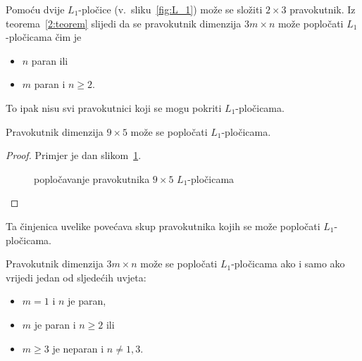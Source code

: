 \documentclass[11pt]{scrartcl}
\begin{document}
Pomoću dvije $L_1$-pločice (v.\ sliku~\ref{fig:L_1}) može se složiti $2 \times 3$ pravokutnik. Iz teorema~\ref{2:teorem} slijedi da se pravokutnik dimenzija $3m \times n$ može popločati $L_1$-pločicama čim je
\begin{itemize}
\item $n$ paran ili
\item $m$ paran i $n \geq 2$.
\end{itemize}
To ipak nisu svi pravokutnici koji se mogu pokriti $L_1$-pločicama. 
\begin{lema} \label{L_1:lema}
Pravokutnik dimenzija $9 \times 5$ može se popločati $L_1$-pločicama.
\end{lema}
\begin{proof}
Primjer je dan slikom~\ref{fig:9times5}.
\begin{figure}[ht]
\centering
{}
\caption{popločavanje pravokutnika $9 \times 5$ $L_1$-pločicama}
\label{fig:9times5}
\end{figure}
\end{proof}
\noindent Ta činjenica uvelike povećava skup pravokutnika kojih se može popločati $L_1$-pločicama.
\begin{teorem} Pravokutnik dimenzija $3m \times n$ može se popločati $L_1$-pločicama ako i samo ako vrijedi jedan od sljedećih uvjeta:
\begin{itemize}
\item $m = 1$ i $n$ je paran,
\item $m$ je paran i $n \geq 2$ ili
\item $m \geq 3$ je neparan i $n \neq 1,3$.
\end{itemize}
\end{teorem}
\end{document}
